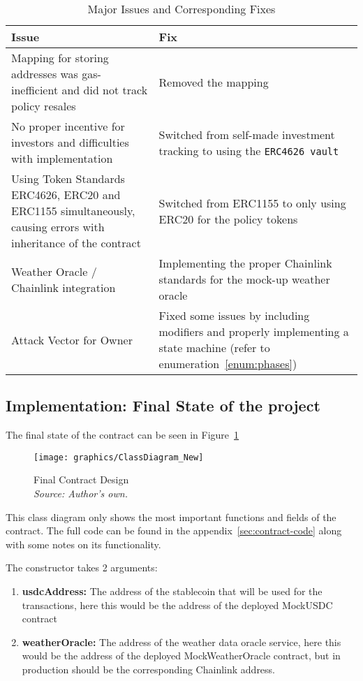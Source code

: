 \documentclass[11pt,a4paper]{article}
\begin{document}
		\begin{table}[h]
			\centering
			\caption{Major Issues and Corresponding Fixes}
			\label{tab:issues-fixes}
			\begin{tabular}{|p{0.42\textwidth}|p{}|}
				\hline
				\textbf{Issue} & \textbf{Fix} \\
				\hline
				Mapping for storing addresses was gas-inefficient and did not track policy resales & Removed the mapping \\
				\hline
				No proper incentive for investors and difficulties with implementation & Switched from self-made investment tracking to using the \texttt{ERC4626 vault} \\
				\hline
				Using Token Standards ERC4626, ERC20 and ERC1155 simultaneously, causing errors with inheritance of the contract & Switched from ERC1155 to only using ERC20 for the policy tokens \\
				\hline
				Weather Oracle / Chainlink integration & Implementing the proper Chainlink standards for the mock-up weather oracle~\parencite{AggregatorV3Interface} \\
				\hline
				Attack Vector for Owner & Fixed some issues by including modifiers and properly implementing a state machine (refer to enumeration~\ref{enum:phases}) \\
				\hline
			\end{tabular}
		\end{table}

		\subsection{Implementation: Final State of the project}\label{subsec:final-state}

		The final state of the contract can be seen in Figure~\ref{fig:final-contract-design}
		\begin{figure}[h]
			\centering
			\texttt{[image: graphics/ClassDiagram\_New]}
			\caption{Final Contract Design \\ \textit{Source: Author's own.}}
			\label{fig:final-contract-design}
		\end{figure}

		This class diagram only shows the most important functions and fields of the contract.
		The full code can be found in the appendix~\ref{sec:contract-code} along with some notes on its functionality.

		The constructor takes 2 arguments:
		\begin{enumerate}[(1)]
			\item \textbf{usdcAddress:} The address of the stablecoin that will be used for the transactions, here this would be the address of the deployed MockUSDC contract
			\item \textbf{weatherOracle:} The address of the weather data oracle service, here this would be the address of the deployed MockWeatherOracle contract, but in production should be the corresponding Chainlink address.
		\end{enumerate}
\end{document}
